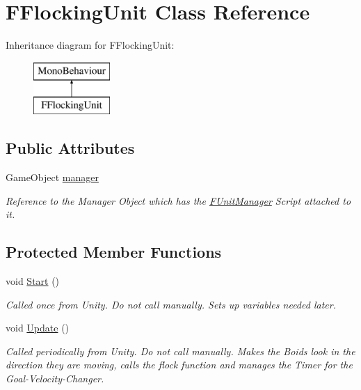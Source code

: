 \hypertarget{class_f_flocking_unit}{}\section{F\+Flocking\+Unit Class Reference}
\label{class_f_flocking_unit}
Inheritance diagram for F\+Flocking\+Unit\+:\begin{figure}[H]
\begin{center}
\leavevmode
\includegraphics[height=2.000000cm]{class_f_flocking_unit}
\end{center}
\end{figure}
\subsection*{Public Attributes}
\begin{DoxyCompactItemize}
\item 
Game\+Object \hyperlink{class_f_flocking_unit_af63c7d39a0269bb66be7f75c7ee830be}{manager}
\begin{DoxyCompactList}\small\item\em Reference to the Manager Object which has the \hyperlink{class_f_unit_manager}{F\+Unit\+Manager} Script attached to it. \end{DoxyCompactList}\end{DoxyCompactItemize}
\subsection*{Protected Member Functions}
\begin{DoxyCompactItemize}
\item 
\mbox{\label{class_f_flocking_unit_a2d94e65705a7536fc3c16b2013f9cc16}} 
void \hyperlink{class_f_flocking_unit_a2d94e65705a7536fc3c16b2013f9cc16}{Start} ()
\begin{DoxyCompactList}\small\item\em Called once from Unity. Do not call manually. Sets up variables needed later. \end{DoxyCompactList}\item 
void \hyperlink{class_f_flocking_unit_a86c5e9761219f7e36329f497406ef47b}{Update} ()
\begin{DoxyCompactList}\small\item\em Called periodically from Unity. Do not call manually. Makes the Boids look in the direction they are moving, calls the flock function and manages the Timer for the Goal-\/\+Velocity-\/\+Changer. \end{DoxyCompactList}\end{DoxyCompactItemize}


